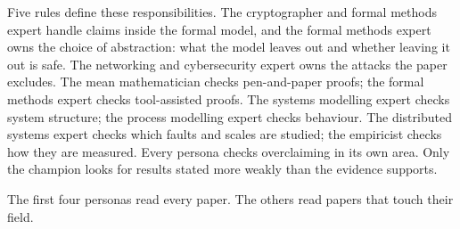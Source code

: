 Five rules define these responsibilities. The cryptographer and formal methods expert handle claims inside the formal model, and the formal methods expert owns the choice of abstraction: what the model leaves out and whether leaving it out is safe. The networking and cybersecurity expert owns the attacks the paper excludes. The mean mathematician checks pen-and-paper proofs; the formal methods expert checks tool-assisted proofs. The systems modelling expert checks system structure; the process modelling expert checks behaviour. The distributed systems expert checks which faults and scales are studied; the empiricist checks how they are measured. Every persona checks overclaiming in its own area. Only the champion looks for results stated more weakly than the evidence supports.

The first four personas read every paper. The others read papers that touch their field.
